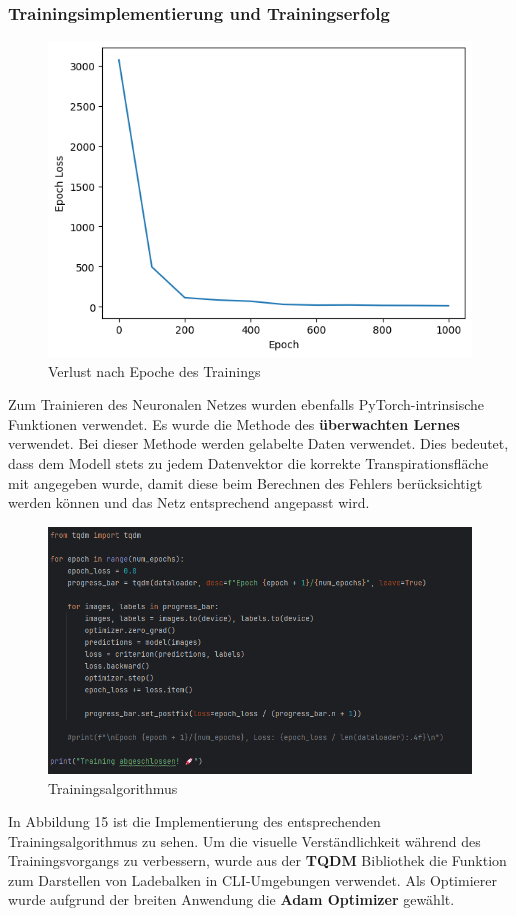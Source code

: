 \subsubsection{Trainingsimplementierung und Trainingserfolg}
\begin{figure}
    \centering
    \includegraphics[width=0.8\linewidth]{loss.png}
    \caption{Verlust nach Epoche des Trainings}
    \label{fig:enter-label}
\end{figure}
Zum Trainieren des Neuronalen Netzes wurden ebenfalls PyTorch-intrinsische Funktionen verwendet. Es wurde die Methode des \textbf{überwachten Lernes} verwendet. Bei dieser Methode werden gelabelte Daten verwendet. Dies bedeutet, dass dem Modell stets zu jedem Datenvektor die korrekte Transpirationsfläche mit angegeben wurde, damit diese beim Berechnen des Fehlers berücksichtigt werden können und das Netz entsprechend angepasst wird.
\begin{figure}
    \centering
    \includegraphics[width=1\linewidth]{Screenshot 2025-03-30 171125.png}
    \caption{Trainingsalgorithmus}
    \label{fig:enter-label}
\end{figure}
In Abbildung 15 ist die Implementierung des entsprechenden Trainingsalgorithmus zu sehen. Um die visuelle Verständlichkeit während des Trainingsvorgangs zu verbessern, wurde aus der \textbf{TQDM} Bibliothek die Funktion zum Darstellen von Ladebalken in CLI-Umgebungen verwendet. Als Optimierer wurde aufgrund der breiten Anwendung die \textbf{Adam Optimizer} gewählt.
